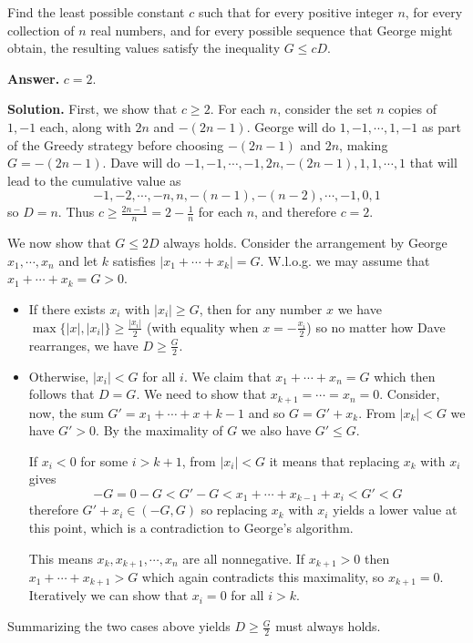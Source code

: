 \documentclass[11pt,a4paper]{article}
\begin{document}
\begin{enumerate}
	Find the least possible constant $c$ such that for every positive integer $n$, for every collection of $n$ real numbers, and for every possible sequence that George might obtain, the resulting values satisfy the inequality $G\le cD$.
	
	
	\textbf{Answer.} $c=2$. 
	
	\textbf{Solution.} First, we show that $c\ge 2$. For each $n$, consider the set $n$ copies of $1, -1$ each, along with $2n$ and $-(2n-1)$. George will do $1, -1, \cdots , 1, -1$ as part of the Greedy strategy before choosing $-(2n-1)$ and $2n$, making $G=-(2n-1)$. Dave will do $-1, -1, \cdots , -1, 2n, -(2n-1), 1, 1, \cdots , 1$ that will lead to the cumulative value as 
	\[-1, -2, \cdots , -n, n, -(n-1), -(n-2), \cdots , -1, 0, 1
	\]
	so $D=n$. Thus $c\ge \frac{2n-1}{n}=2-\frac{1}{n}$ for each $n$, and therefore $c=2$. 
	
	We now show that $G\le 2D$ always holds. Consider the arrangement by George $x_1, \cdots , x_n$ and let $k$ satisfies $|x_1+\cdots + x_k| = G$. W.l.o.g. we may assume that $x_1+\cdots + x_k = G>0$. 
	\begin{itemize}
		\item If there exists $x_i$ with $|x_i|\ge G$, then for any number $x$ we have $\max\{|x|, |x_i|\}\ge \frac{|x_i|}{2}$ (with equality when $x=-\frac{x_i}{2}$) so no matter how Dave rearranges, we have $D\ge \frac{G}{2}$. 
		
		\item Otherwise, $|x_i| < G$ for all $i$. We claim that $x_1+\cdots + x_n=G$ which then follows that $D=G$. We need to show that $x_{k+1}= \cdots = x_{n} = 0$. Consider, now, the sum $G'=x_1+\cdots +x+{k-1}$ and so $G=G'+x_k$. From $|x_k|<G$ we have $G'>0$. By the maximality of $G$ we also have $G'\le G$. 
		
		If $x_i<0$ for some $i>k+1$, from $|x_i|<G$ it means that replacing $x_k$ with $x_{i}$ gives 
		\[
		-G = 0 - G < G'-G < x_1+\cdots + x_{k-1}+ x_i < G' < G
		\]
		therefore $G'+x_i\in (-G, G)$ so replacing $x_k$ with $x_i$ yields a lower value at this point, which is a contradiction to George's algorithm. 
		
		This means $x_k, x_{k+1}, \cdots , x_n$ are all nonnegative. If $x_{k+1}>0$ then $x_{1}+\cdots + x_{k+1}>G$ which again contradicts this maximality, so $x_{k+1}=0$. Iteratively we can show that $x_i=0$ for all $i>k$. 
		
	\end{itemize}
	Summarizing the two cases above yields $D\ge \frac{G}{2}$ must always holds. 
	

\end{enumerate}
\end{document}
